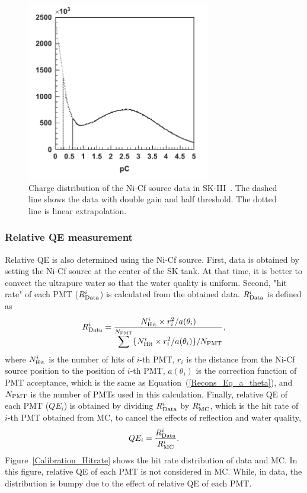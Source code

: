 \begin{figure}[h]
	\centering
	\includegraphics[width=8cm]{Figures/Calibration/Single-pe}
	\caption[Charge distribution of the Ni-Cf source data in SK-III]{
	Charge distribution of the Ni-Cf source data in SK-III~\cite{2014AbeCalib}.
	The dashed line shows the data with double gain and half threshold.
	The dotted line is linear extrapolation.
	}\label{Calibration_Single-pe}
\end{figure}

\subsubsection{Relative QE measurement}\label{Subsubsec_QE}
\vs\hs
Relative QE is also determined using the Ni-Cf source.
First, data is obtained by setting the Ni-Cf source at the center of the SK tank.
At that time, it is better to convect the ultrapure water so that the water quality is uniform.
Second, "hit rate" of each PMT ($R_{\rm Data}^{i}$) is calculated from the obtained data.
$R_{\rm Data}^{i}$ is defined as
\begin{eqnarray}
	R_{\rm Data}^{i} = {N_{\rm Hit}^{i} \times r_{i}^{2}/a(\theta_{i}) \over \displaystyle \sum^{N_{\rm PMT}} \{N_{\rm Hit}^{i} \times r_{i}^{2}/a(\theta_{i})\}/N_{\rm PMT}},
\end{eqnarray}
where $N_{\rm Hit}^{i}$ is the number of hits of $i$-th PMT, $r_{i}$ is the distance from the Ni-Cf source position to the position of $i$-th PMT, $a(\theta_{i})$ is the correction function of PMT acceptance, which is the same as Equation~(\ref{Recons_Eq_a_theta}), and $N_{\rm PMT}$ is the number of PMTs used in this calculation.
Finally, relative QE of each PMT ($QE_{i}$) is obtained by dividing $R_{\rm Data}^{i}$ by $R_{\rm MC}^{i}$, which is the hit rate of $i$-th PMT obtained from MC, to cancel the effects of reflection and water quality,
\begin{eqnarray}
	QE_{i} = {R_{\rm Data}^{i} \over R_{\rm MC}^{i}}.
\end{eqnarray}
Figure~\ref{Calibration_Hitrate} shows the hit rate distribution of data and MC.
In this figure, relative QE of each PMT is not considered in MC.
While, in data, the distribution is bumpy due to the effect of relative QE of each PMT.

